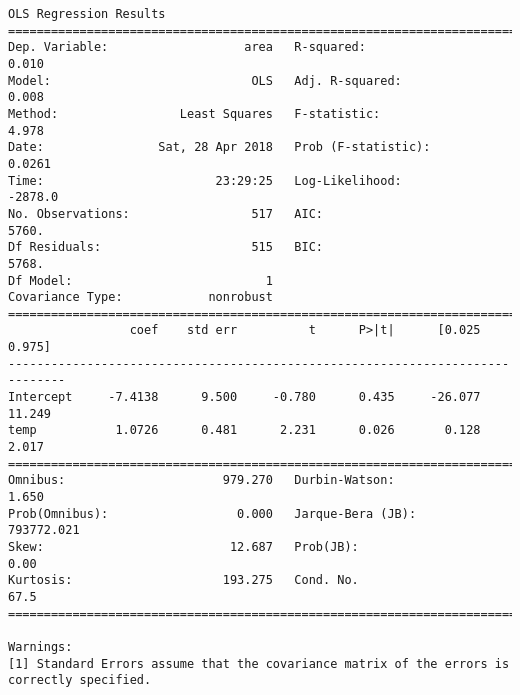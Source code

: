 \documentclass[11pt]{article}
\begin{document}
\begin{Verbatim}[commandchars=\\\{\}]
                            OLS Regression Results                            
==============================================================================
Dep. Variable:                   area   R-squared:                       0.010
Model:                            OLS   Adj. R-squared:                  0.008
Method:                 Least Squares   F-statistic:                     4.978
Date:                Sat, 28 Apr 2018   Prob (F-statistic):             0.0261
Time:                        23:29:25   Log-Likelihood:                -2878.0
No. Observations:                 517   AIC:                             5760.
Df Residuals:                     515   BIC:                             5768.
Df Model:                           1                                         
Covariance Type:            nonrobust                                         
==============================================================================
                 coef    std err          t      P>|t|      [0.025      0.975]
------------------------------------------------------------------------------
Intercept     -7.4138      9.500     -0.780      0.435     -26.077      11.249
temp           1.0726      0.481      2.231      0.026       0.128       2.017
==============================================================================
Omnibus:                      979.270   Durbin-Watson:                   1.650
Prob(Omnibus):                  0.000   Jarque-Bera (JB):           793772.021
Skew:                          12.687   Prob(JB):                         0.00
Kurtosis:                     193.275   Cond. No.                         67.5
==============================================================================

Warnings:
[1] Standard Errors assume that the covariance matrix of the errors is correctly specified.



\end{Verbatim}
\end{document}
